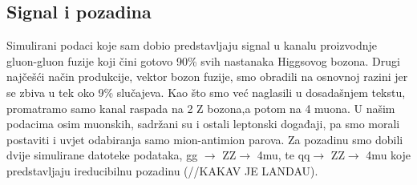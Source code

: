 \documentclass[12pt,a4paper,oneside]{article}
\begin{document}
\begin{linenumbers}
		\subsection{Signal i pozadina}
		Simulirani podaci koje sam dobio predstavljaju signal u kanalu proizvodnje gluon-gluon fuzije koji čini gotovo 90\% svih nastanaka Higgsovog bozona. Drugi najčešći način produkcije, vektor bozon fuzije, smo obradili na osnovnoj razini jer se zbiva u tek oko 9\% slučajeva. Kao što smo već naglasili u dosadašnjem tekstu, promatramo samo kanal raspada na 2 Z bozona,a potom na 4 muona. U našim podacima osim muonskih, sadržani su i ostali leptonski događaji, pa smo morali postaviti i uvjet odabiranja samo mion-antimion parova.
		Za pozadinu smo dobili dvije simulirane datoteke podataka, gg $\rightarrow$ ZZ$\rightarrow$ 4mu, te qq$\rightarrow$ ZZ$\rightarrow$ 4mu koje predstavljaju ireducibilnu pozadinu (//KAKAV JE LANDAU).
		

\end{linenumbers}
\end{document}
